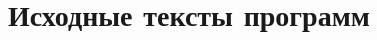 \documentclass[utf8x,12pt, coursreport]{G7-32}
\begin{document}

\appendix

\chapter{Исходные тексты программ}

{\small{}}

\end{document}
